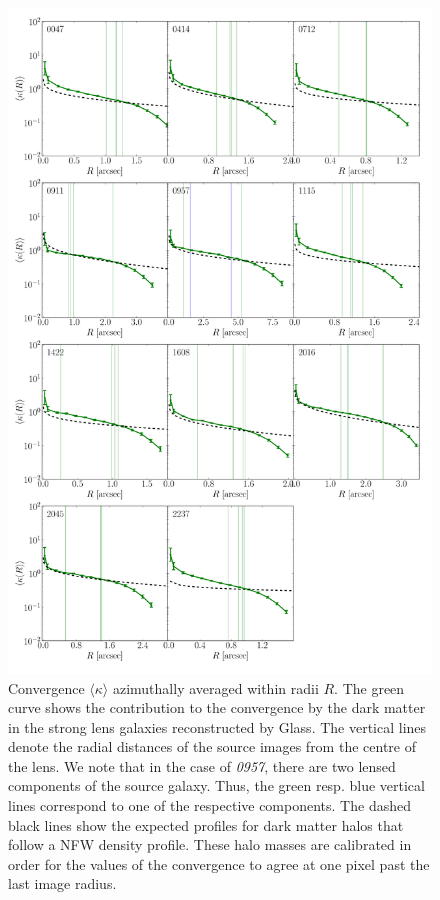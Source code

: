 \documentclass[useAMS,usenatbib]{mn2e}
\def\Glass{{\sc Glass}}
\begin{document}
\begin{figure}
  \centering
  \includegraphics[width=.8\linewidth]{Figures/kappaplot.pdf}
  \caption[width=\linewidth]{Convergence $\langle\kappa\rangle$ azimuthally averaged within radii $R$. The green curve shows the contribution to the convergence by the dark matter in the strong lens galaxies reconstructed by \Glass. The vertical lines denote the radial distances of the source images from the centre of the lens. We note that in the case of \textit{0957}, there are two lensed components of the source galaxy. Thus, the green resp. blue vertical lines correspond to one of the respective components. The dashed black lines show the expected profiles for dark matter halos that follow a NFW density profile. These halo masses are calibrated in order for the values of the convergence to agree at one pixel past the last image radius.}
  \label{fig:kappaplot}
\end{figure}
\end{document}
